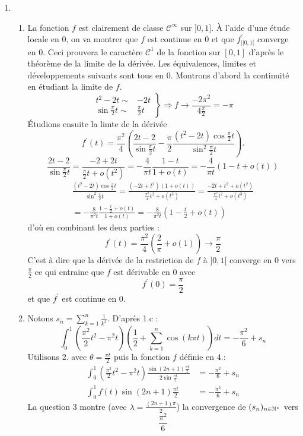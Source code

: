 \begin{enumerate}
\item
\begin{enumerate}
 \item La fonction $f$ est clairement de classe $\mathcal{C}^{\infty}$ sur $]0,1]$. \`A l'aide d'une étude locale en 0, on va montrer que $f$ est continue en 0 et que $f^\prime_{\vert ]0,1[}$ converge en 0. Ceci prouvera le caractère $\mathcal C ^1$ de la fonction sur $[0,1]$ d'après le théorème de la limite de la dérivée.\newline
Les équivalences, limites et développements suivants sont tous en $0$.\newline
Montrons d'abord la continuité en étudiant la limite de $f$.
\begin{displaymath}
\left. 
\begin{aligned}
  t^2-2t  \sim&  -2t \\
\sin \frac{\pi}{2}t  \sim&  \frac{\pi}{2}t
\end{aligned}
\right\rbrace 
\Rightarrow f \rightarrow \frac{-2\pi^2}{4\frac{\pi}{2}} =-\pi 
\end{displaymath}
\'Etudions ensuite la limte de la dérivée
\[f^\prime (t)=\frac{\pi^2}{4}\left( \frac{2t-2}{\sin \frac{\pi}{2}t} - \frac{\pi}{2}\frac{(t^2-2t)\cos \frac{\pi}{2}t}{\sin ^2 \frac{\pi}{2}t}\right). \]
\[
\frac{2t-2}{\sin \frac{\pi}{2}t}=\frac{-2+2t}{\frac{\pi}{2}t+o(t^2)}=-\frac{4}{\pi t}\frac{1-t}{1+o(t)} = -\frac{4}{\pi t}(1-t+o(t))
\]
\begin{multline*}
 \frac{(t^2-2t)\cos \frac{\pi}{2}t}{\sin ^2 \frac{\pi}{2}t}
= \frac{(-2t+t^2)(1+o(t))}{\frac{\pi^2}{4}t^2+o(t^3)} 
= \frac{-2t+t^2+o(t^2)}{\frac{\pi^2}{4}t^2+o(t^3)}\\
= -\frac{8}{\pi^2 t}\frac{1-\frac{t}{2}+o(t)}{1+o(t)}
= -\frac{8}{\pi^2 t}(1-\frac{t}{2}+o(t))
\end{multline*}
d'où en combinant les deux parties :
\begin{displaymath}
f^\prime (t)=\frac{\pi ^2}{4}(\frac{2}{\pi}+o(1))\rightarrow \frac{\pi}{2} 
\end{displaymath}
C'est à dire que la dérivée de la restriction de $f$ à $]0,1[$ converge en 0 vers $\frac{\pi}{2}$ ce qui entraine que $f$ est dérivable en $0$ avec \[f^\prime(0)=\frac{\pi}{2}\] et que $f^\prime$ est continue en $0$.

\item Notons $s_n=\sum_{k=1}^n\frac{1}{k^2}$. D'après 1.c :
\[\int_0 ^1(\frac{\pi^2}{2}t^2-\pi^2t)\left( \frac{1}{2} + \sum_{k=1}^n \cos (k\pi t)\right) dt = -\frac{\pi^2}{6}+s_n\]
Utilisons 2. avec $\theta=\frac{\pi t}{2}$ puis la fonction $f$ définie en 4.:
\begin{align*}
\int_0 ^1(\frac{\pi^2}{2}t^2-\pi^2t)\frac{\sin (2n+1)\frac{\pi t}{2}}{2\sin \frac{\pi t}{2}} &= -\frac{\pi^2}{6}+s_n \\
\int_0^1f(t)\sin (2n+1)\frac{\pi t}{2} &=-\frac{\pi^2}{6}+s_n
\end{align*}
La question 3 montre (avec $\lambda=\frac{(2n+1)\pi}{2}$) la convergence de $(s_n)_{n\in\mathbb{N}^*}$ vers
\[\frac{\pi^2}{6}\]
\end{enumerate}
\end{enumerate}